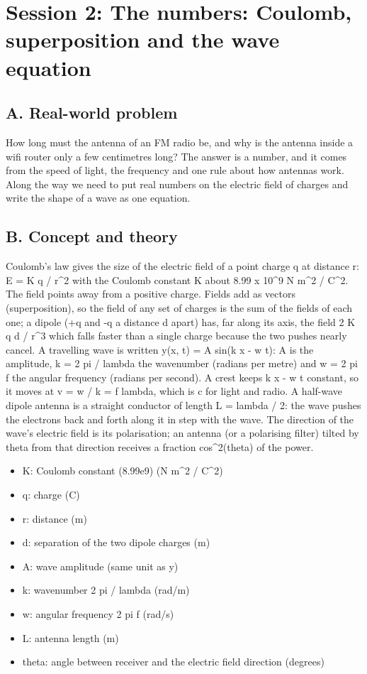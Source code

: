 \documentclass[11pt,a4paper]{article}
\begin{document}
\section{Session 2: The numbers: Coulomb, superposition and the wave equation}

\subsection*{A. Real-world problem}
How long must the antenna of an FM radio be, and why is the antenna inside a wifi router only a few centimetres long? The answer is a number, and it comes from the speed of light, the frequency and one rule about how antennas work. Along the way we need to put real numbers on the electric field of charges and write the shape of a wave as one equation.

\subsection*{B. Concept and theory}
Coulomb's law gives the size of the electric field of a point charge q at distance r: E = K \textbar{}q\textbar{} / r\textasciicircum{}2 with the Coulomb constant K about 8.99 x 10\textasciicircum{}9 N m\textasciicircum{}2 / C\textasciicircum{}2. The field points away from a positive charge. Fields add as vectors (superposition), so the field of any set of charges is the sum of the fields of each one; a dipole (+q and -q a distance d apart) has, far along its axis, the field 2 K q d / r\textasciicircum{}3 which falls faster than a single charge because the two pushes nearly cancel. A travelling wave is written y(x, t) = A sin(k x - w t): A is the amplitude, k = 2 pi / lambda the wavenumber (radians per metre) and w = 2 pi f the angular frequency (radians per second). A crest keeps k x - w t constant, so it moves at v = w / k = f lambda, which is c for light and radio. A half-wave dipole antenna is a straight conductor of length L = lambda / 2: the wave pushes the electrons back and forth along it in step with the wave. The direction of the wave's electric field is its polarisation; an antenna (or a polarising filter) tilted by theta from that direction receives a fraction cos\textasciicircum{}2(theta) of the power.

\begin{itemize}[nosep]
\item K: Coulomb constant (8.99e9) (N m\textasciicircum{}2 / C\textasciicircum{}2)
\item q: charge (C)
\item r: distance (m)
\item d: separation of the two dipole charges (m)
\item A: wave amplitude (same unit as y)
\item k: wavenumber 2 pi / lambda (rad/m)
\item w: angular frequency 2 pi f (rad/s)
\item L: antenna length (m)
\item theta: angle between receiver and the electric field direction (degrees)
\end{itemize}
\end{document}
